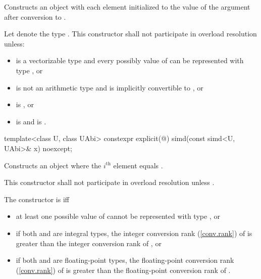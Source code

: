 \begin{itemdescr}
  \pnum\effects
  Constructs an object with each element initialized to the value of the argument after conversion to .

  \pnum\remarks
  Let  denote the type . This constructor shall not participate in overload resolution unless:
  \begin{itemize}
    \item {} is a vectorizable type and every possibly value of  can be represented with type , or
    \item {} is not an arithmetic type and is implicitly convertible to , or
    \item {} is , or
    \item {} is  and  is .%
  \end{itemize}

\end{itemdescr}

\begin{itemdecl}
template<class U, class UAbi> constexpr explicit(@\seebelow@) simd(const simd<U, UAbi>& x) noexcept;
\end{itemdecl}

\begin{itemdescr}
  \pnum\effects
  Constructs an object where the $i^\text{th}$ element equals  \foralli.

  \pnum\remarks
  This constructor shall not participate in overload resolution unless
  .

    \pnum
    The constructor is  iff
    \begin{itemize}
      \item at least one possible value of  cannot be represented with type , or
      \item if both  and  are integral types, the integer conversion rank (\mbox{\ref{conv.rank}}) of  is greater than the integer conversion rank of , or
      \item if both  and  are floating-point types, the floating-point conversion rank (\mbox{\ref{conv.rank}}) of  is greater than the floating-point conversion rank of .
    \end{itemize}
\end{itemdescr}

